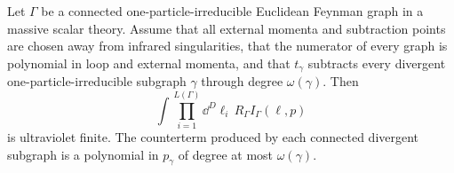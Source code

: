 \begin{theorem}
\label{thm:bphz-finiteness-massive-euclidean-scalar}
Let \(\Gamma\) be a connected one-particle-irreducible Euclidean Feynman graph
in a massive scalar theory.  Assume that all external momenta and subtraction
points are chosen away from infrared singularities, that the numerator of
every graph is polynomial in loop and external momenta, and that \(t_\gamma\)
subtracts every divergent one-particle-irreducible subgraph \(\gamma\) through
degree \(\omega(\gamma)\).  Then
\[
  \int \prod_{i=1}^{L(\Gamma)}\dd^D\ell_i\,
  R_\Gamma I_\Gamma(\ell,p)
\]
is ultraviolet finite.  The counterterm produced by each connected divergent
subgraph is a polynomial in \(p_\gamma\) of degree at most \(\omega(\gamma)\).
\end{theorem}


